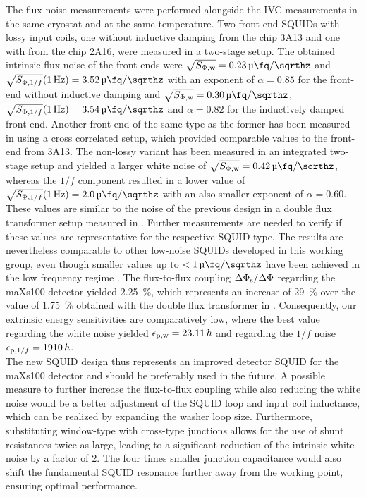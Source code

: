 The flux noise measurements were performed alongside the IVC measurements in the same cryostat and at the same temperature. Two front-end SQUIDs with lossy input coils, one without inductive damping from the chip 3A13 and one with from the chip 2A16, were measured in a two-stage setup. The obtained intrinsic flux noise of the front-ends were  $\sqrt{S_{\rm \Phi,w}}=\qty{0.23}{\micro\fq\per\sqrthz}$ and $\sqrt{S_{{\rm \Phi},1/f}}(\qty{1}{\Hz})=\qty{3.52}{\micro\fq\per\sqrthz}$ with an exponent of $\alpha=0.85$ for the front-end without inductive damping and $\sqrt{S_{\rm \Phi,w}}=\qty{0.30}{\micro\fq\per\sqrthz}$, $\sqrt{S_{{\rm \Phi},1/f}}(\qty{1}{\Hz})=\qty{3.54}{\micro\fq\per\sqrthz}$ and $\alpha=0.82$ for the inductively damped front-end. Another front-end of the same type as the former has been measured in \cite{Mazibrada2024} using a cross correlated setup, which provided comparable values to the front-end from 3A13. The non-lossy variant has been measured in an integrated two-stage setup and yielded a larger white noise of $\sqrt{S_{\rm \Phi,w}}=\qty{0.42}{\micro\fq\per\sqrthz}$, whereas the $1/f$ component resulted in a lower value of $\sqrt{S_{{\rm \Phi},1/f}}(\qty{1}{\Hz})=\qty{2.0}{\micro\fq\per\sqrthz}$ with an also smaller exponent of $\alpha=0.60$. These values are similar to the noise of the previous design in a double flux transformer setup measured in \cite{Bauer2022}. Further measurements are needed to verify if these values are representative for the respective SQUID type. The results are nevertheless comparable to other low-noise SQUIDs developed in this working group, even though smaller values up to $<\qty{1}{\micro\fq\per\sqrthz}$ have been achieved in the low frequency regime \cite{Ferring2015}. The flux-to-flux coupling $\Delta\Phi_{\rm s}/\Delta\Phi$ regarding the maXs100 detector yielded \qty{2.25}{\percent}, which represents an increase of \qty{29}{\percent} over the value of \qty{1.75}{\percent} obtained with the double flux transformer in \cite{Bauer2022}. Consequently, our extrinsic energy sensitivities are comparatively low, where the best value regarding the white noise yielded $\epsilon_{\rm p,w}=23.11\, h$ and regarding the $1/f$ noise $\epsilon_{{\rm p}, 1/f}=1910\, h$. \\

The new SQUID design thus represents an improved detector SQUID for the maXs100 detector and should be preferably used in the future. A possible measure to further increase the flux-to-flux coupling while also reducing the white noise would be a better adjustment of the SQUID loop and input coil inductance, which can be realized by expanding the washer loop size. Furthermore, substituting window-type with cross-type junctions allows for the use of shunt resistances twice as large, leading to a significant reduction of the intrinsic white noise by a factor of 2. The four times smaller junction capacitance would also shift the fundamental SQUID resonance further away from the working point, ensuring optimal performance. 
